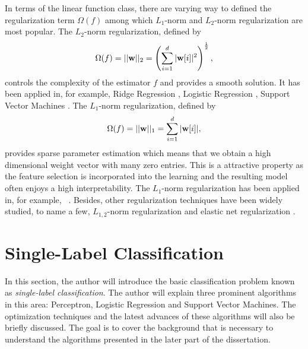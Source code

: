 In terms of the linear function class, there are varying way to defined the regularization term $\Omega(f)$ among which $L_1$-norm and $L_2$-norm regularization are most popular.
The $L_2$-norm regularization, defined by 
\begin{align*}
	\Omega(f) = ||\mathbf {w}||_2=\left(\sum_{i=1}^d|\mathbf {w}[i]|^2\right)^{\frac{1}{2}},
\end{align*} 
controls the complexity of the estimator $f$ and provides a smooth solution.
It has been applied in, for example, Ridge Regression \citep{Hoerl00ridge}, Logistic Regression \citep{Chen00}, Support Vector Machines \citep{Cortes95support}.
The $L_1$-norm regularization, defined by
\begin{align*}
	\Omega(f) = ||\mathbf {w}||_1=\sum_{i=1}^d|\mathbf {w}[i]|,
\end{align*}
provides sparse parameter estimation which means that we obtain a high dimensional weight vector with many zero entries.
This is a attractive property as the feature selection is incorporated into the learning and the resulting model often enjoys a high interpretability.
The $L_1$-norm regularization has been applied in, for example, \lasso\ \citep{Tibshirani94regression}.
Besides, other regularization techniques have been widely studied, to name a few, $L_{1,2}$-norm regularization \citep{Argyriou07multitask} and elastic net regularization \citep{Zou05regularizationa}.


%
\section{Single-Label Classification}\label{sc_slc}

In this section, the author will introduce the basic classification problem known as \textit{single-label classification}.
The author will explain three prominent algorithms in this area: Perceptron, Logistic Regression and Support Vector Machines.
The optimization techniques and the latest advances of these algorithms will also be briefly discussed.
The goal is to cover the background that is necessary to understand the algorithms presented in the later part of the dissertation. 

%
%
